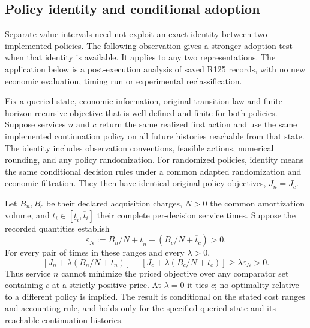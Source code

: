 \subsection{Policy identity and conditional adoption}
\label{sec:policyidentity125}

Separate value intervals need not exploit an exact identity between two
implemented policies. The following observation gives a stronger adoption
test when that identity is available. It applies to any two representations.
The application below is a post-execution analysis of saved R125 records,
with no new economic evaluation, timing run or experimental reclassification.

\begin{proposition}
\label{prop:policyidentity125}
Fix a queried state, economic information, original transition law and
finite-horizon recursive objective that is well-defined and finite for
both policies. Suppose services $n$ and $c$ return
the same realized first action and use the same implemented continuation
policy on all future histories reachable from that state. The identity
includes observation conventions, feasible actions, numerical rounding,
and any policy randomization. For randomized policies, identity means
the same conditional decision rules under a common adapted randomization
and economic filtration.
They then have identical original-policy objectives, $J_n=J_c$.

Let $B_n,B_c$ be their declared acquisition charges, $N>0$ the common
amortization volume, and
$t_i\in[\underline t_i,\overline t_i]$ their complete per-decision
service times. Suppose the recorded quantities establish
\begin{equation}\label{eq:identitycostgap125}
 \varepsilon_N:=B_n/N+\underline t_n
                  -(B_c/N+\overline t_c)>0.
\end{equation}
For every pair of times in these ranges and every $\lambda>0$,
\begin{equation}\label{eq:identitydominance125}
 [J_n+\lambda(B_n/N+t_n)]-[J_c+\lambda(B_c/N+t_c)]
                         \ge\lambda\varepsilon_N>0.
\end{equation}
Thus service $n$ cannot minimize the priced objective over any comparator
set containing $c$ at a strictly positive price. At $\lambda=0$ it ties
$c$; no optimality relative to a different policy is implied. The result
is conditional on the stated cost ranges and accounting rule, and holds
only for the specified queried state and its reachable continuation histories.
\end{proposition}


